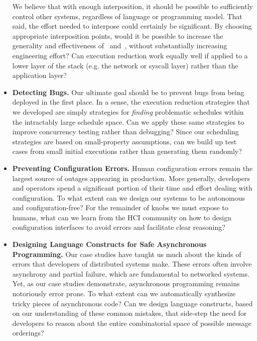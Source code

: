 \begin{itemize}
We believe that with enough interposition, it should be possible to
sufficiently control other systems, regardless of language or
programming model. That said, the effort needed to interpose could certainly be
significant. By choosing appropriate interposition points, would it be
possible to increase the generality and effectiveness of
\projectname~and~\sys, without substantially increasing engineering effort?
Can execution reduction work equally well if applied to a lower layer of the
stack (e.g.
the network or syscall layer) rather than the application layer?

\item \textbf{Detecting Bugs.} Our ultimate goal should be to prevent bugs
from being deployed in the first place. In a sense, the execution reduction
strategies that we developed are simply strategies for \textit{finding}
problematic schedules
within the intractably large schedule space. Can we apply these same
strategies to improve concurrency testing rather than debugging? Since our
scheduling strategies are based on small-property assumptions, can we build
up test cases from small initial executions rather than generating them randomly?

\item \textbf{Preventing Configuration Errors.} Human configuration errors
remain the largest source of outages appearing in production.
More generally, developers and operators spend a significant portion of their time and effort dealing with configuration.
To what extent can we design our systems to be autonomous and configuration-free? For the remainder of knobs we must
expose to humans, what can we learn from the HCI community on how to design configuration interfaces to avoid errors and facilitate clear reasoning?

\item \textbf{Designing Language Constructs for Safe Asynchronous
Programming.} Our case studies have taught us much about the kinds of errors
that developers of distributed systems make. These errors often involve
asynchrony and partial failure, which  are fundamental to networked systems.
Yet, as our case studies demonstrate, asynchronous programming remains
notoriously error prone. To what extent can we automatically synthesize tricky
pieces of asynchronous code? Can we design language constructs, based on our
understanding of these common mistakes, that side-step the need for developers to reason about the entire combinatorial space of possible message orderings?

\end{itemize}

